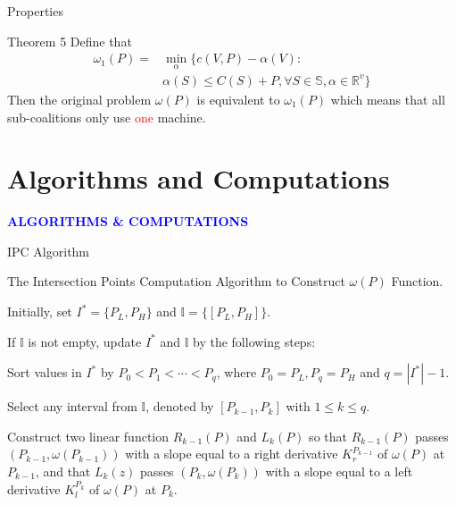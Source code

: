 \documentclass[14pt]{beamer}
\begin{document}
\begin{frame}{Properties}
	\vspace{-1mm}
	\small


		\begin{block}{Theorem 5}
			Define that
			\begin{eqnarray*}
			{\omega_1(P)}=&\mathop{\min}_{\alpha}\{c(V,P)-\alpha(V): \\
			&\alpha(S)\leq C(S)+P,\forall S \in \mathbb{S}, \alpha\in\mathbb{R}^{v}\}
			\end{eqnarray*}
			Then the original problem $\omega(P)$ is equivalent to $\omega_1(P)$ which means that all sub-coalitions only use \textcolor{red}{one} machine.
		\end{block}

\end{frame}


\section{Algorithms and Computations}
\begin{frame}
\centering
\large
\textcolor{blue}{\bf {\huge A}LGORITHMS \&  {\huge C}OMPUTATIONS}
\end{frame}

\begin{frame}{IPC Algorithm}
	\vspace{-3mm}
	\begin{block}
	{The Intersection Points Computation Algorithm to Construct $\omega(P)$ Function.}
	\end{block}
	\begin{description}
	\justifying
	\footnotesize
	\vspace{3mm}
	\item[Step 1.] Initially, set $I^*=\{P_L,P_H\}$ and $\mathbb{I}= \{[P_L,P_H]\}$.
  \item[Step 2.] If $\mathbb{I}$ is not empty, update $I^*$ and $\mathbb{I}$ by the following steps:
  \item[Step 3.] Sort values in $I^*$ by $P_0<P_1<\cdots<P_q$, where $P_0 = P_L,P_q = P_H$ and $q = |I^*|-1$.
  \item[Step 4.]
  Select any interval from $\mathbb{I}$, denoted by $[P_{k-1},P_{k}]$ with $1\leq k \leq q$.
	\item[Step 5.]
	Construct two linear function $ R_{k-1}(P)$ and $ L_{k}(P)$ so that $ R_{k-1}(P)$ passes $(P_{k-1},\omega(P_{k-1}))$ with a slope equal to a right derivative $K_{r}^{P_{k-1}}$ of $\omega(P)$ at $P_{k-1}$, and that $L_{k}(z)$ passes $(P_{k},\omega(P_{k}))$ with a slope equal to a left derivative $K_{l}^{P_{k}}$ of $\omega(P)$ at $P_k$.
	\end{description}
\end{frame}
\end{document}
